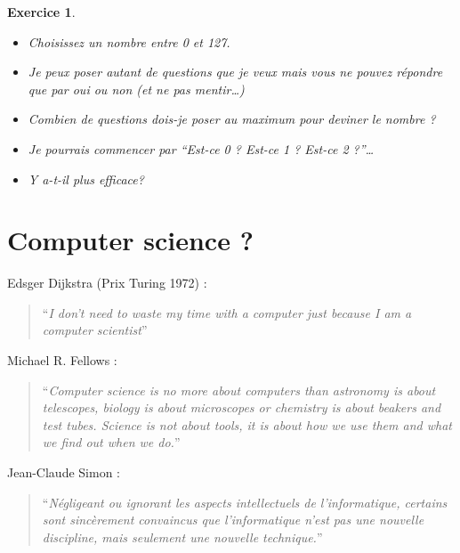 \documentclass[french]{beamer}
\newtheorem{exercice}{Exercice}
\begin{document}
\begin{frame}
  \begin{exercice}
    \begin{itemize}
    \item Choisissez un nombre entre 0 et 127.

\item Je peux poser autant de questions que je veux mais vous ne pouvez
répondre que par oui ou non (et ne pas mentir\ldots{})

\item Combien de questions dois-je poser au maximum pour deviner le nombre ?

\item Je pourrais commencer par ``Est-ce 0 ? Est-ce 1 ? Est-ce 2 ?''\ldots{}
\item Y a-t-il plus efficace?
\end{itemize}
\end{exercice}
\end{frame}

\section{Computer science ?}

\begin{frame}

Edsger Dijkstra (Prix Turing 1972) :

\begin{quote}
``\emph{I don't need to waste my time with a computer just because I am
a computer scientist}''
\end{quote}

\end{frame}

\begin{frame}

Michael R. Fellows :

\begin{quote}
``\emph{Computer science is no more about computers than astronomy is
about telescopes, biology is about microscopes or chemistry is about
beakers and test tubes. Science is not about tools, it is about how we
use them and what we find out when we do.}''
\end{quote}
\end{frame}

\begin{frame}

Jean-Claude Simon :

\begin{quote}
``\emph{Négligeant ou ignorant les aspects intellectuels de
l'informatique, certains sont sincèrement convaincus que l'informatique
n'est pas une nouvelle discipline, mais seulement une nouvelle
technique.}''
\end{quote}

\end{frame}
\end{document}
